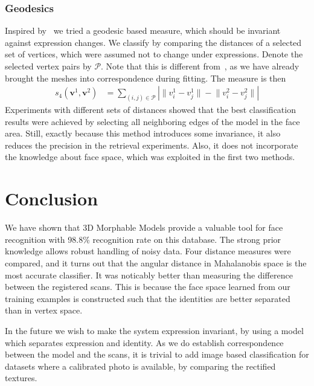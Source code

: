 \documentclass{vgtc}                          %
\newcommand*{\SET}[1]  {\ensuremath{\mathcal{#1}}}
\newcommand*{\MAT}[1]  {\ensuremath{\mathbf{#1}}}
\newcommand*{\norm}[1]{\mathopen\| #1 \mathclose\|}%
\newcommand*{\absLR}[1]{\left| #1 \right|}%
\begin{document}
\subsubsection{Geodesics}
Inspired by~\cite{bronstein05:face_rec} we tried a geodesic based measure,
which should be invariant against expression changes. We classify by comparing
the distances of a selected set of vertices, which were assumed not to change
under expressions.  Denote the selected vertex pairs by $\SET P$. Note that
this is different from~\cite{bronstein05:face_rec}, as we have already brought
the meshes into correspondence during fitting. The measure is then
\begin{align}
  s_4(\MAT v^1, \MAT v^2) &= \sum_{(i,j)\in \SET P} \absLR{ \norm{v^1_i - v^1_j} - \norm{v^2_i - v^2_j}}
\end{align}
Experiments with different sets of distances showed that the best
classification results were achieved by selecting all neighboring edges of the
model in the face area. Still, exactly because this method introduces some
invariance, it also reduces the precision in the retrieval experiments. Also,
it does not incorporate the knowledge about face space, which was exploited in
the first two methods.

\section{Conclusion}
We have shown that 3D Morphable Models provide a valuable tool for face
recognition with 98.8\% recognition rate on this database. The strong prior
knowledge allows robust handling of noisy data. Four distance measures
were compared, and it turns out that the angular distance in Mahalanobis space
is the most accurate classifier. It was noticably better than measuring
the difference between the registered scans. This is because the face space
learned from our training examples is constructed such that the identities are
better separated than in vertex space.

In the future we wish to make the system expression invariant, by using a
model which separates expression and identity. As we do establish
correspondence between the model and the scans, it is trivial to add image
based classification for datasets where a calibrated photo is available, by
comparing the rectified textures.




\end{document}
